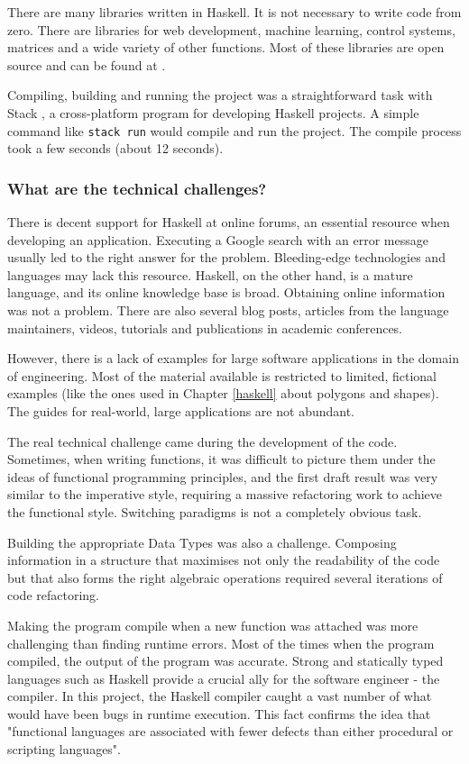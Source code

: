 There are many libraries written in Haskell. It is not necessary to write code from zero. There are libraries for web development, machine learning, control systems, matrices and a wide variety of other functions. Most of these libraries are open source and can be found at \cite{hackage}.

Compiling, building and running the project was a straightforward task with Stack \cite{stack}, a cross-platform program for developing Haskell projects. A simple command like \lstinline!stack run! would compile and run the project. The compile process took a few seconds (about 12 seconds).


\subsubsection{What are the technical challenges? }


There is decent support for Haskell at online forums, an essential resource when developing an application. Executing a Google search with an error message usually led to the right answer for the problem. Bleeding-edge technologies and languages may lack this resource. Haskell, on the other hand, is a mature language, and its online knowledge base is broad. Obtaining online information was not a problem. There are also several blog posts, articles from the language maintainers, videos, tutorials and publications in academic conferences.

However, there is a lack of examples for large software applications in the domain of engineering. Most of the material available is restricted to limited, fictional examples (like the ones used in Chapter \ref{haskell} about polygons and shapes). The guides for real-world, large applications are not abundant.

The real technical challenge came during the development of the code. Sometimes, when writing functions, it was difficult to picture them under the ideas of functional programming principles, and the first draft result was very similar to the imperative style, requiring a massive refactoring work to achieve the functional style. Switching paradigms is not a completely obvious task.

Building the appropriate Data Types was also a challenge. Composing information in a structure that maximises not only the readability of the code but that also forms the right algebraic operations required several iterations of code refactoring.

Making the program compile when a  new function was attached was more challenging than finding runtime errors. Most of the times when the program compiled, the output of the program was accurate. Strong and statically typed languages such as Haskell provide a crucial ally for the software engineer - the compiler. In this project, the Haskell compiler caught a vast number of what would have been bugs in runtime execution. This fact confirms the idea that "functional languages are associated with fewer defects than either procedural or scripting languages"\cite{ray2014large}.

